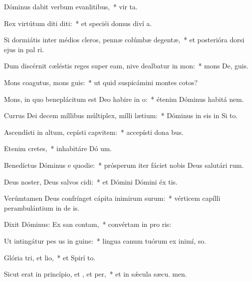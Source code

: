 \item Dóminus dabit verbum evanlitibus,~* vir ta.
\item Rex virtútum diti diti:~* et speciéi domus diví a.
\item Si dormiátis inter médios cleros, pennæ colúmbæ degentæ,~* et posterióra dorsi ejus in pal ri.
\item Dum discérnit cæléstis reges super eam, nive dealbatur in mon:~* mons De,  guis.
\item Mons coagutus, mons guis:~* ut quid suspicámini montes cotos?
\item Mons, in quo beneplácitum est Deo habire in o:~* étenim Dóminus habitá  nem.
\item Currus Dei decem míllibus múltiplex, mílli lætium:~* Dóminus in eis in Si  to.
\item Ascendísti in altum, cepísti capvitem:~* accepísti dona  bus.
\item Etenim  cretes,~* inhabitáre Dó um.
\item Benedíctus Dóminus e quodie:~* prósperum iter fáciet nobis Deus salutári rum.
\item Deus noster, Deus salvos cidi:~* et Dómini Dómini éx tis.
\item Verúmtamen Deus confrínget cápita inimirum surum:~* vérticem capílli perambulántium in de is.
\item Dixit Dóminus: Ex san contam,~* convértam in pro ris:
\item Ut intingátur pes us in guine:~* lingua canum tuórum ex inimí,  so.
\item Glória tri, et lio,~* et Spirí to.
\item Sicut erat in princípio, et , et per,~* et in sǽcula sæcu. men.
